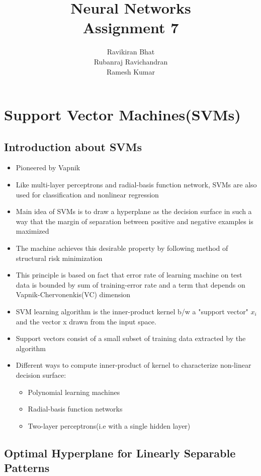 \documentclass[12pt]{article}
\title{\Huge Neural Networks \\
[6mm]
Assignment 7\\}
\author{Ravikiran Bhat\\
Rubanraj Ravichandran\\
Ramesh Kumar}
\begin{document}
\maketitle
\newpage

\section{Support Vector Machines(SVMs)}

 
\subsection{Introduction about SVMs}

\begin{itemize}
	\item Pioneered by Vapnik
	\item Like multi-layer perceptrons and radial-basis function network, SVMs are also used for classification and nonlinear regression
	\item Main idea of SVMs is to draw a hyperplane as the decision surface in such a way that the margin of separation between positive and negative examples is maximized
	\item The machine achieves this desirable property by following method of structural risk minimization 
	\item This principle is based on fact that error rate of learning machine on test data is bounded by sum of training-error rate and a term that depends on Vapnik-Chervonenkis(VC) dimension
	\item SVM learning algorithm is the inner-product kernel b/w a "support vector" $x_{i}$ and the vector x drawn from the input space.
	\item Support vectors consist of a small subset of training data extracted by the algorithm
	\item Different ways to compute inner-product of kernel to characterize non-linear decision surface:
		\begin{itemize}
			\item Polynomial learning machines
			\item Radial-basis function networks
			\item Two-layer perceptrons(i.e with a single hidden layer)
		\end{itemize}
\end{itemize}


\subsection{Optimal Hyperplane for Linearly Separable Patterns}
\end{document}
